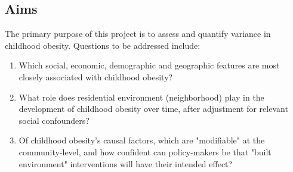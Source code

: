 \documentclass[11pt]{article}
\begin{document}
\subsection*{Aims}
The primary purpose of this project is to assess and quantify variance in childhood obesity.  Questions to be addressed include:
\begin{enumerate}
\item Which social, economic, demographic and geographic features are most closely associated with childhood obesity?
\item What role does residential environment (neighborhood) play in the development of childhood obesity over time, after adjustment for relevant social confounders?
\item Of childhood obesity's causal factors, which are "modifiable" at the community-level, and how confident can policy-makers be that "built environment" interventions will have their intended effect?
\end{enumerate}


\end{document}
